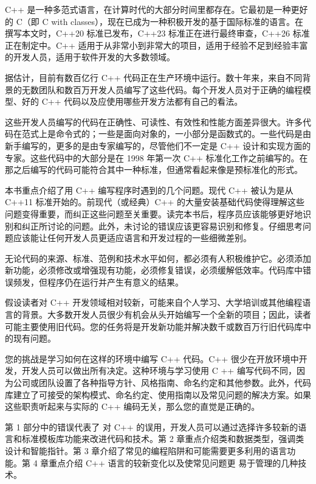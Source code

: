 
C++ 是一种多范式语言，在计算时代的大部分时间里都存在。它最初是一种更好的 C（即 C with classes），现在已成为一种积极开发的基于国际标准的语言。在撰写本文时，C++20 标准已发布，C++23 标准正在进行最终审查，C++26 标准正在制定中。C++ 适用于从非常小到非常大的项目，适用于经验不足到经验丰富的开发人员，适用于软件开发的大多数领域。

据估计，目前有数百亿行 C++ 代码正在生产环境中运行。数十年来，来自不同背景的无数团队和数百万开发人员编写了这些代码。每个开发人员对于正确的编程模型、好的 C++ 代码以及应使用哪些开发方法都有自己的看法。

这些开发人员编写的代码在正确性、可读性、有效性和性能方面差异很大。许多代码在范式上是命令式的；一些是面向对象的，一小部分是函数式的。一些代码是由新手编写的，更多的是由专家编写的，尽管他们不一定是 C++ 设计和实现方面的专家。这些代码中的大部分是在 1998 年第一次 C++ 标准化工作之前编写的。在那之后编写的代码可能符合其中一种标准，但通常看起来像是预标准化的形式。

本书重点介绍了用 C++ 编写程序时遇到的几个问题。现代 C++ 被认为是从 C++11 标准开始的。前现代（或经典）C++ 的大量安装基础代码使得理解这些问题变得重要，而纠正这些问题至关重要。读完本书后，程序员应该能够更好地识别和纠正所讨论的问题。此外，未讨论的错误应该更容易识别和修复。仔细思考问题应该能让任何开发人员更适应语言和开发过程的一些细微差别。


无论代码的来源、标准、范例和技术水平如何，都必须有人积极维护它。必须添加新功能，必须修改或增强现有功能，必须修复错误，必须缓解低效率。代码库中错误频发，但程序仍在运行并产生有意义的结果。

假设读者对 C++ 开发领域相对较新，可能来自个人学习、大学培训或其他编程语言的背景。大多数开发人员很少有机会从头开始编写一个全新的项目；因此，读者可能主要使用旧代码。您的任务将是开发新功能并解决数千或数百万行旧代码库中的现有问题。

您的挑战是学习如何在这样的环境中编写 C++ 代码。C++ 很少在开放环境中开发，开发人员可以做出所有决定。这种环境与学习使用 C ++ 编写代码不同，因为公司或团队设置了各种指导方针、风格指南、命名约定和其他参数。此外，代码库建立了可接受的架构模式、命名约定、使用指南以及常见问题的解决方案。如果这些职责听起来与实际的 C++ 编码无关，那么您的直觉是正确的。


第 1 部分中的错误代表了 对 C++ 的误用，开发人员可以通过选择许多较新的语言和标准模板库功能来改进代码和技术。第 2 章重点介绍类和数据类型，强调类设计和智能指针。第 3 章介绍了常见的编程陷阱和可能需要更多利用的语言功能。第 4 章重点介绍 C++ 语言的较新变化以及使常见问题更 易于管理的几种技术。

